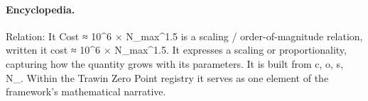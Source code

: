 \paragraph{Encyclopedia.}
Relation: It Cost ≈ 10\textasciicircum{}6 × N\_max\textasciicircum{}1.5 is a scaling / order-of-magnitude relation, written it cost ≈ 10\textasciicircum{}6 × N\_max\textasciicircum{}1.5. It expresses a scaling or proportionality, capturing how the quantity grows with its parameters. It is built from c, o, s, N\_. Within the Trawin Zero Point registry it serves as one element of the framework's mathematical narrative.
